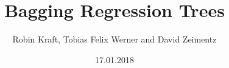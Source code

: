 \documentclass{beamer}
\title[Bagging Regression Trees]{Bagging Regression Trees}
\author[Kraft, Werner, Zeimentz]{Robin Kraft, Tobias Felix Werner and David Zeimentz}
\institute[Uni. Bonn]{University of Bonn}
\date{17.01.2018}
\begin{document}
\begin{frame}
  \titlepage
\end{frame}







\end{document}
